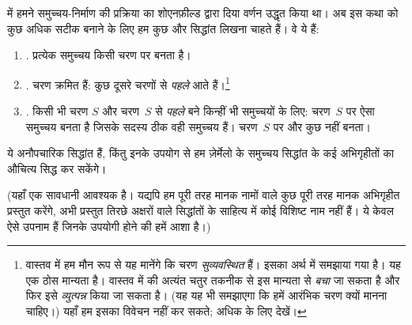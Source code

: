 \documentclass[../../../include/open-logic-section]{subfiles}
\begin{document}
	
 में हमने समुच्चय-निर्माण की प्रक्रिया का
शोएनफ़ील्ड द्वारा दिया वर्णन उद्धृत किया था। अब इस कथा को कुछ अधिक सटीक
बनाने के लिए हम कुछ और सिद्धांत लिखना चाहते हैं। वे ये हैं:
\begin{enumerate}
\item[] \stageshier. प्रत्येक समुच्चय किसी चरण पर बनता है।
\item[] \stagesord. चरण क्रमित हैं: कुछ दूसरे चरणों से \emph{पहले} आते
हैं।\footnote{वास्तव में हम मौन रूप से यह मानेंगे कि चरण \emph{सुव्यवस्थित}
हैं। इसका अर्थ  में समझाया गया है। यह एक ठोस मान्यता
है। वास्तव में \citet{Scott1974} की अत्यंत चतुर तकनीक से इस मान्यता से
\emph{बचा} जा सकता है और फिर इसे \emph{व्युत्पन्न} किया जा सकता है। (यह यह
भी समझाएगा कि हमें आरंभिक चरण क्यों मानना चाहिए।) यहाँ हम इसका विवेचन नहीं
कर सकते; अधिक के लिए \citet{ButtonLT1} देखें।}
\item[] \stagesacc. किसी भी चरण $S$ और चरण~$S$ से \emph{पहले} बने किन्हीं
भी समुच्चयों के लिए: चरण~$S$ पर ऐसा समुच्चय बनता है जिसके सदस्य ठीक वही
समुच्चय हैं। चरण~$S$ पर और कुछ नहीं बनता।
\end{enumerate}
ये अनौपचारिक सिद्धांत हैं, किंतु इनके उपयोग से हम ज़ेर्मेलो के समुच्चय
सिद्धांत के कई अभिगृहीतों का औचित्य सिद्ध कर सकेंगे।

(यहाँ एक सावधानी आवश्यक है। यद्यपि हम पूरी तरह मानक नामों वाले कुछ पूरी तरह
मानक अभिगृहीत प्रस्तुत करेंगे, अभी प्रस्तुत तिरछे अक्षरों वाले सिद्धांतों के
साहित्य में कोई विशिष्ट नाम नहीं हैं। ये केवल ऐसे उपनाम हैं जिनके उपयोगी
होने की हमें आशा है।)
\end{document}
